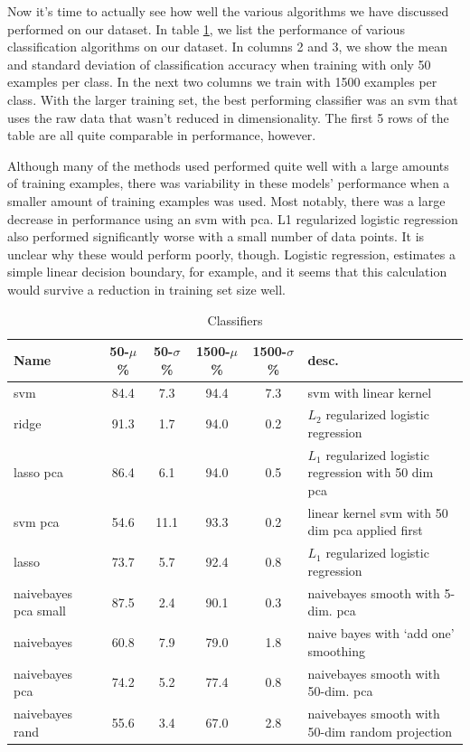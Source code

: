 
%

Now it's time to actually see how well the various algorithms we have discussed performed on our dataset. In table \ref{tab:Classifiers}, we list the performance of various classification algorithms on our dataset. In columns 2 and 3, we show the mean and standard deviation of classification accuracy when training with only 50 examples per class. In the next two columns we train with 1500 examples per class. With the larger training set, the best performing classifier was an svm that uses the raw data that wasn't reduced in dimensionality. The first 5 rows of the table are all quite comparable in performance, however. 

Although many of the methods used performed quite well with a large amounts of training examples, there was variability in these models' performance when a smaller amount of training examples was used. Most notably, there was a large decrease in performance using an svm with pca. L1 regularized logistic regression also performed significantly worse with a small number of data points. It is unclear why these would perform poorly, though. Logistic regression, estimates a simple linear decision boundary, for example, and it seems that this calculation would survive a reduction in training set size well. 

\begin{center}
\begin{table}
\begin{tabular}{lccccl}
\hline
Name & 50-$\mu$ \% & 50-$\sigma$ \% & 1500-$\mu$ \% & 1500-$\sigma$ \% &  desc.\\
\hline
svm & 84.4 & 7.3 & 94.4 & 7.3 & svm with linear kernel\\
ridge & 91.3 & 1.7 & 94.0 & 0.2 & $L_2$ regularized logistic regression\\
lasso pca &  86.4 & 6.1& 94.0 & 0.5 & $L_1$ regularized logistic regression with 50 dim pca\\
svm pca &54.6 & 11.1&  93.3 & 0.2 &  linear kernel svm with 50 dim pca applied first\\
lasso & 73.7& 5.7 & 92.4 & 0.8 & $L_1$ regularized logistic regression\\
naivebayes pca small & 87.5& 2.4 & 90.1 & 0.3  & naivebayes smooth with 5-dim. pca\\
naivebayes & 60.8 & 7.9& 79.0 & 1.8& naive bayes with `add one' smoothing\\
naivebayes pca  & 74.2 & 5.2 & 77.4 & 0.8 & naivebayes smooth with 50-dim. pca\\
naivebayes rand & 55.6 & 3.4 & 67.0 & 2.8  & naivebayes smooth with 50-dim random projection\\
\end{tabular}
\caption{Classifiers}
\label{tab:Classifiers}
\par
\end{table}
\end{center}



